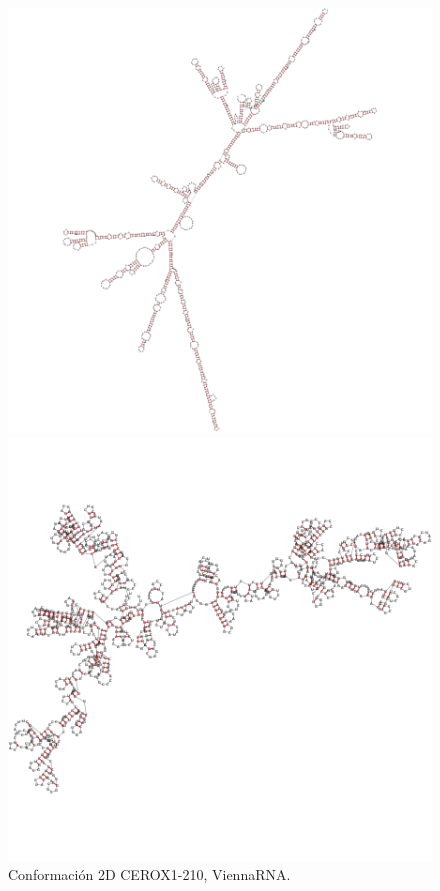 \documentclass[a4paper,11pt,titlepage]{article}
\theoremstyle{definition}
\begin{document}
\begin{figure}[H]
    \centering
    \begin{minipage}[c]{0.31\textwidth}
        \centering
        \includegraphics[width=\textwidth]{images/CEROX1-210-db_vrna.png}
        \caption{Conformación 2D CEROX1-210, ViennaRNA.}
        \label{fig:CEROX1-210-vrna}
    \end{minipage}
    \hfill
    \begin{minipage}[c]{0.31\textwidth}
        \centering
        \includegraphics[width=\textwidth]{images/CEROX1-210-db_rndc.png}

\end{minipage}
\end{figure}
\end{document}
